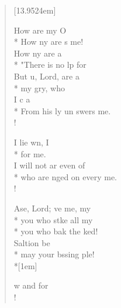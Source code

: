\begin{flushleft}
\begin{verse}[13.9524em]

 How  are my  O \\*
How ny are s   me!\\
 How ny are  a \\*
"There is no lp for   \\
 But u, Lord, are a   \\*
my gry, who    \\
 I c a   \\*
From his ly un  swers me.\\!

 I lie wn, I    \\*
for    me.\\
 I will not ar even  of \\*
who are nged on every   me.\\!

Ase, Lord; ve me, my \flagflex{\dag}\\*
 you who stke all my    \\*
you who bak the    ked!\\
 Saltion be   \\*
may your bssing    ple!\\*[1em]

w and for  \\!
\end{verse}
\end{flushleft}
